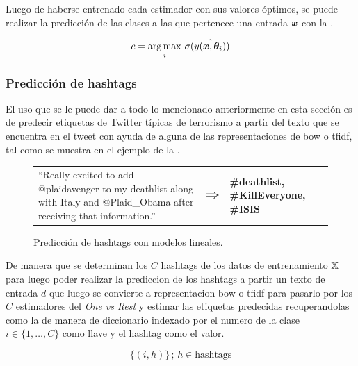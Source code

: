 Luego de haberse entrenado cada estimador con sus valores óptimos, se puede realizar la predicción de las clases a las que pertenece una entrada ${\bm{x}}$ con la .

\begin{equation} \label{eq:ovr-prediction}
  c = \operatorname*{arg\,max}_i \, \sigma(\hat{y({\bm{x}}, {\bm{\theta}}_i)})
\end{equation}

\subsubsection{Predicción de hashtags}
El uso que se le puede dar a todo lo mencionado anteriormente en esta sección es de predecir etiquetas de Twitter típicas de terrorismo a partir del texto que se encuentra en el tweet con ayuda de alguna de las representaciones de \gls{bow} o \gls{tfidf}, tal como se muestra en el ejemplo de la .

\begin{figure}[H]
  \centering
  \begin{tabular}{p{} p{} p{}}
    ``Really excited to add @plaidavenger to my deathlist along with Italy and @Plaid\_Obama after receiving that information.'' & $\mathlarger{\mathlarger{\mathlarger{\Rightarrow}}}$ & \textbf{\#deathlist, \#KillEveryone, \#ISIS}
  \end{tabular}
  \decoRule
  \caption{Predicción de hashtags con modelos lineales.}
  \label{fig:tweet-prediction}
\end{figure}

De manera que se determinan los $C$ hashtags de los datos de entrenamiento ${\mathbb{X}}$ para luego poder realizar la prediccion de los hashtags a partir un texto de entrada $d$ que luego se convierte a representacion \gls{bow} o \gls{tfidf} para pasarlo por los $C$ estimadores del \emph{One vs Rest} y estimar las etiquetas predecidas recuperandolas como la  de manera de diccionario indexado por el numero de la clase $i \in \{1, \ldots, C\}$ como llave y el hashtag como el valor.

\begin{equation} \label{eq:ovr-inverse-transform}
    \{(i, h)\} \,;\, h \in \text{hashtags}
\end{equation}


